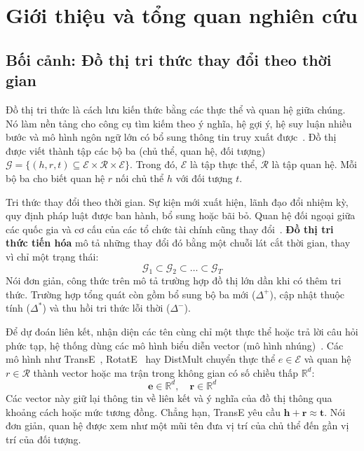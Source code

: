 \chapter{Giới thiệu và tổng quan nghiên cứu}
\label{chap:introduction}

\section{Bối cảnh: Đồ thị tri thức thay đổi theo thời gian}
\label{sec:background}

Đồ thị tri thức là cách lưu kiến thức bằng các thực thể và quan hệ giữa chúng. Nó làm nền tảng cho công cụ tìm kiếm theo ý nghĩa, hệ gợi ý, hệ suy luận nhiều bước và mô hình ngôn ngữ lớn có bổ sung thông tin truy xuất được~\cite{ji2021survey,nickel2016review}. Đồ thị được viết thành tập các bộ ba (chủ thể, quan hệ, đối tượng) $\mathcal{G} = \{(h, r, t) \subseteq \mathcal{E} \times \mathcal{R} \times \mathcal{E}\}$. Trong đó, $\mathcal{E}$ là tập thực thể, $\mathcal{R}$ là tập quan hệ. Mỗi bộ ba cho biết quan hệ $r$ nối chủ thể $h$ với đối tượng $t$.

Tri thức thay đổi theo thời gian. Sự kiện mới xuất hiện, lãnh đạo đổi nhiệm kỳ, quy định pháp luật được ban hành, bổ sung hoặc bãi bỏ. Quan hệ đối ngoại giữa các quốc gia và cơ cấu của các tổ chức tài chính cũng thay đổi~\cite{snodgrass1986temporal,jensen1999bitemporal}. \textbf{Đồ thị tri thức tiến hóa} mô tả những thay đổi đó bằng một chuỗi lát cắt thời gian, thay vì chỉ một trạng thái:
\begin{equation}
    \mathcal{G}_1 \subset \mathcal{G}_2 \subset \dots \subset \mathcal{G}_T
\end{equation}
Nói đơn giản, công thức trên mô tả trường hợp đồ thị lớn dần khi có thêm tri thức. Trường hợp tổng quát còn gồm bổ sung bộ ba mới ($\Delta^+$), cập nhật thuộc tính ($\Delta^*$) và thu hồi tri thức lỗi thời ($\Delta^-$).

Để dự đoán liên kết, nhận diện các tên cùng chỉ một thực thể hoặc trả lời câu hỏi phức tạp, hệ thống dùng các mô hình biểu diễn vector (mô hình nhúng)~\cite{bordes2013translating,sun2019rotate,trouillon2016complex}. Các mô hình như TransE~\cite{bordes2013translating}, RotatE~\cite{sun2019rotate} hay DistMult chuyển thực thể $e \in \mathcal{E}$ và quan hệ $r \in \mathcal{R}$ thành vector hoặc ma trận trong không gian có số chiều thấp $\mathbb{R}^d$:
\begin{equation}
    \mathbf{e} \in \mathbb{R}^d, \quad \mathbf{r} \in \mathbb{R}^d
\end{equation}
Các vector này giữ lại thông tin về liên kết và ý nghĩa của đồ thị thông qua khoảng cách hoặc mức tương đồng. Chẳng hạn, TransE yêu cầu $\mathbf{h} + \mathbf{r} \approx \mathbf{t}$. Nói đơn giản, quan hệ được xem như một mũi tên đưa vị trí của chủ thể đến gần vị trí của đối tượng.

